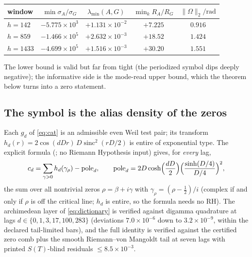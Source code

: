\documentclass[11pt,a4paper]{article}
\theoremstyle{remark}
\DeclareMathOperator{\sinc}{sinc}
\begin{document}
\begin{center}
\small
\begin{tabular}{lcccc}
\toprule
window & $\min\sigma_A/\sigma_G$ & $\lambda_{\min}(A,G)$ &
$\min_kR_A/R_G$ & $\lVert\Omega\rVert_2/\mathrm{rad}$\\
\midrule
$h=142$  & $-5.775\times10^{3}$ & $+1.131\times10^{-2}$ & $+7.225$ & $0.916$\\
$h=859$  & $-1.466\times10^{5}$ & $+2.632\times10^{-3}$ & $+18.52$ & $1.424$\\
$h=1433$ & $-4.699\times10^{5}$ & $+1.516\times10^{-3}$ & $+30.20$ & $1.551$\\
\bottomrule
\end{tabular}
\end{center}

\noindent The lower bound is valid but far from tight (the periodized
symbol dips deeply negative); the informative side is the mode-read
upper bound, which the theorem below turns into a zero statement.

\subsection{The symbol is the alias density of the zeros}

Each $g_d$ of \eqref{eq:cat} is an admissible even Weil test pair; its
transform $h_d(r)=2\cos(dDr)\,D\sinc^2(rD/2)$ is entire of exponential
type.  The explicit formula (\cite[Thm.~5.12]{IK04}; no Riemann
Hypothesis input) gives, for \emph{every} lag,
\begin{equation}\label{eq:dictionary}
c_d=\sum_{\gamma>0}h_d(\gamma_\rho)-\mathrm{pole}_d,\qquad
\mathrm{pole}_d=2D\cosh\Bigl(\frac{dD}{2}\Bigr)
\Bigl(\frac{\sinh(D/4)}{D/4}\Bigr)^{2},
\end{equation}
the sum over all nontrivial zeros $\rho=\beta+i\gamma$ with
$\gamma_\rho=(\rho-\tfrac12)/i$ (complex if and only if $\rho$ is off
the critical line; $h_d$ is entire, so the formula needs no RH).  The
archimedean layer of \eqref{eq:dictionary} is verified against digamma
quadrature at lags $d\in\{0,1,3,17,100,283\}$ (deviations
$7.0\times10^{-6}$ down to $3.2\times10^{-9}$, within the declared
tail-limited bars), and the full identity is verified against the
certified zero comb plus the smooth Riemann--von Mangoldt tail at seven
lags with printed $S(T)$-blind residuals $\le 8.5\times10^{-3}$.
\end{document}
